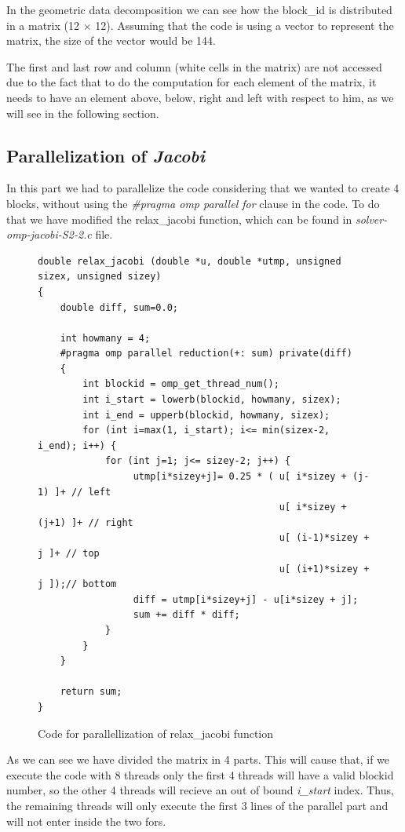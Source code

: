 \documentclass[12pt, a4paper]{article}
\begin{document}
In the geometric data decomposition we can see how the block\_id is distributed in a matrix (12 $\times$ 12). Assuming that the code is using a vector to represent the matrix, the size of the vector would be 144.

The first and last row and column (white cells in the matrix) are not accessed due to the fact that to do the computation for each element of the matrix, it needs to have an element above, below, right and left with respect to him, as we will see in the following section.

\subsection{Parallelization of \textit{Jacobi}}

In this part we had to parallelize the code considering that we wanted to create 4 blocks, without using the \textit{\#pragma omp parallel for} clause in the code. To do that we have modified the relax\_jacobi function, which can be found in \textit{solver-omp-jacobi-S2-2.c} file.

 \begin{figure}[H]
\begin{lstlisting}
double relax_jacobi (double *u, double *utmp, unsigned sizex, unsigned sizey)
{
	double diff, sum=0.0;

	int howmany = 4;
	#pragma omp parallel reduction(+: sum) private(diff)
	{
		int blockid = omp_get_thread_num();
		int i_start = lowerb(blockid, howmany, sizex);
		int i_end = upperb(blockid, howmany, sizex);
		for (int i=max(1, i_start); i<= min(sizex-2, i_end); i++) {
			for (int j=1; j<= sizey-2; j++) {
				 utmp[i*sizey+j]= 0.25 * ( u[ i*sizey + (j-1) ]+ // left
										   u[ i*sizey + (j+1) ]+ // right
							   			   u[ (i-1)*sizey + j ]+ // top
							               u[ (i+1)*sizey + j ]);// bottom
				 diff = utmp[i*sizey+j] - u[i*sizey + j];
				 sum += diff * diff; 
			}
		}
	}

    return sum;
}
\end{lstlisting}
\caption{Code for parallellization of relax\_jacobi function}
\end{figure}

As we can see we have divided the matrix in 4 parts. This will cause that, if we execute the code with 8 threads only the first 4 threads will have a valid blockid number, so the other 4 threads will recieve an out of bound \textit{i\_start} index. Thus, the remaining threads will only execute the first 3 lines of the parallel part and will not enter inside the two fors.
\end{document}
